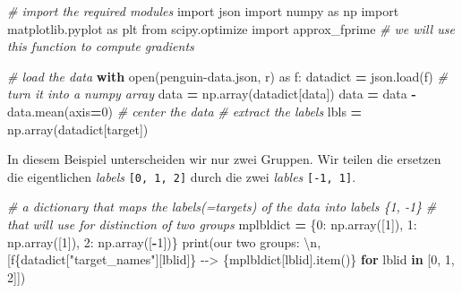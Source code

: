 \documentclass[
]{book}
\newenvironment{Shaded}{\begin{snugshade}}{\end{snugshade}}
\newcommand{\BuiltInTok}[1]{#1}
\newcommand{\CharTok}[1]{\textcolor[rgb]{0.31,0.60,0.02}{#1}}
\newcommand{\CommentTok}[1]{\textcolor[rgb]{0.56,0.35,0.01}{\textit{#1}}}
\newcommand{\ControlFlowTok}[1]{\textcolor[rgb]{0.13,0.29,0.53}{\textbf{#1}}}
\newcommand{\DecValTok}[1]{\textcolor[rgb]{0.00,0.00,0.81}{#1}}
\newcommand{\ImportTok}[1]{#1}
\newcommand{\KeywordTok}[1]{\textcolor[rgb]{0.13,0.29,0.53}{\textbf{#1}}}
\newcommand{\NormalTok}[1]{#1}
\newcommand{\OperatorTok}[1]{\textcolor[rgb]{0.81,0.36,0.00}{\textbf{#1}}}
\newcommand{\SpecialCharTok}[1]{\textcolor[rgb]{0.00,0.00,0.00}{#1}}
\newcommand{\SpecialStringTok}[1]{\textcolor[rgb]{0.31,0.60,0.02}{#1}}
\newcommand{\StringTok}[1]{\textcolor[rgb]{0.31,0.60,0.02}{#1}}
\theoremstyle{definition}
\theoremstyle{definition}
\theoremstyle{definition}
\theoremstyle{definition}
\theoremstyle{remark}
\begin{document}
\begin{Shaded}
\begin{Highlighting}[]
\CommentTok{\# import the required modules}
\ImportTok{import}\NormalTok{ json}
\ImportTok{import}\NormalTok{ numpy }\ImportTok{as}\NormalTok{ np}
\ImportTok{import}\NormalTok{ matplotlib.pyplot }\ImportTok{as}\NormalTok{ plt}
\ImportTok{from}\NormalTok{ scipy.optimize }\ImportTok{import}\NormalTok{ approx\_fprime  }\CommentTok{\# we will use this function to compute gradients}

\CommentTok{\# load the data}
\ControlFlowTok{with} \BuiltInTok{open}\NormalTok{(}\StringTok{\textquotesingle{}penguin{-}data.json\textquotesingle{}}\NormalTok{, }\StringTok{\textquotesingle{}r\textquotesingle{}}\NormalTok{) }\ImportTok{as}\NormalTok{ f:}
\NormalTok{    datadict }\OperatorTok{=}\NormalTok{ json.load(f)}
\CommentTok{\# turn it into a numpy array}
\NormalTok{data }\OperatorTok{=}\NormalTok{ np.array(datadict[}\StringTok{\textquotesingle{}data\textquotesingle{}}\NormalTok{])}
\NormalTok{data }\OperatorTok{=}\NormalTok{ data }\OperatorTok{{-}}\NormalTok{ data.mean(axis}\OperatorTok{=}\DecValTok{0}\NormalTok{)  }\CommentTok{\# center the data}
\CommentTok{\# extract the labels}
\NormalTok{lbls }\OperatorTok{=}\NormalTok{ np.array(datadict[}\StringTok{\textquotesingle{}target\textquotesingle{}}\NormalTok{])}
\end{Highlighting}
\end{Shaded}

In diesem Beispiel unterscheiden wir nur zwei Gruppen. Wir teilen die
ersetzen die eigentlichen \emph{labels} \texttt{{[}0,\ 1,\ 2{]}} durch die zwei \emph{lables} \texttt{{[}-1,\ 1{]}}.

\begin{Shaded}
\begin{Highlighting}[]
\CommentTok{\# a dictionary that maps the labels(=targets) of the data into labels \{1, {-}1\}}
\CommentTok{\# that will use for distinction of two groups}
\NormalTok{mplbldict }\OperatorTok{=}\NormalTok{ \{}\DecValTok{0}\NormalTok{: np.array([}\DecValTok{1}\NormalTok{]),}
             \DecValTok{1}\NormalTok{: np.array([}\DecValTok{1}\NormalTok{]),}
             \DecValTok{2}\NormalTok{: np.array([}\OperatorTok{{-}}\DecValTok{1}\NormalTok{])\}}
\BuiltInTok{print}\NormalTok{(}\StringTok{\textquotesingle{}our two groups: }\CharTok{\textbackslash{}n}\StringTok{\textquotesingle{}}\NormalTok{, [}\SpecialStringTok{f\textquotesingle{}}\SpecialCharTok{\{}\NormalTok{datadict[}\StringTok{"target\_names"}\NormalTok{][lblid]}\SpecialCharTok{\}}\SpecialStringTok{ {-}{-}\textgreater{} }\SpecialCharTok{\{}\NormalTok{mplbldict[lblid]}\SpecialCharTok{.}\NormalTok{item()}\SpecialCharTok{\}}\SpecialStringTok{\textquotesingle{}} \ControlFlowTok{for}\NormalTok{ lblid }\KeywordTok{in}\NormalTok{ [}\DecValTok{0}\NormalTok{, }\DecValTok{1}\NormalTok{, }\DecValTok{2}\NormalTok{]])}
\end{Highlighting}
\end{Shaded}
\end{document}
